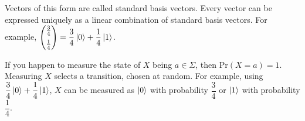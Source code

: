 
\begin{note}
Vectors of this form are called standard basis vectors. Every vector can be expressed uniquely as a linear combination of standard basis vectors. For example,
$\begin{pmatrix}
\frac{3}{4} \\[0.5em]
\frac{1}{4}
\end{pmatrix}
=\dfrac{3}{4}\ket{0}+\dfrac{1}{4}\ket{1}$.
\end{note}

If you happen to measure the state of $X$ being $a\in\Sigma$, then Pr$(X=a)=1$. Measuring $X$ selects a transition, chosen at random. For example, using $\dfrac{3}{4}\ket{0}+\dfrac{1}{4}\ket{1}$, $X$ can be measured as $\ket{0}$ with probability $\dfrac{3}{4}$ or $\ket{1}$ with probability $\dfrac{1}{4}$.

